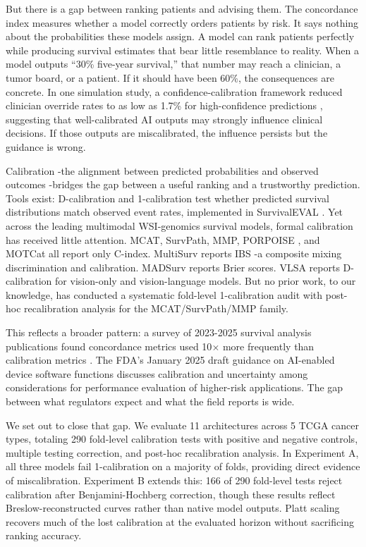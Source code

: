 \documentclass[pmlr]{jmlr}
\begin{document}
But there is a gap between ranking patients and advising them. The concordance index measures whether a model correctly orders patients by risk. It says nothing about the probabilities these models assign. A model can rank patients perfectly while producing survival estimates that bear little resemblance to reality. When a model outputs ``30\% five-year survival,'' that number may reach a clinician, a tumor board, or a patient. If it should have been 60\%, the consequences are concrete. In one simulation study, a confidence-calibration framework reduced clinician override rates to as low as 1.7\% for high-confidence predictions \citep{yu2025enhancing}, suggesting that well-calibrated AI outputs may strongly influence clinical decisions. If those outputs are miscalibrated, the influence persists but the guidance is wrong.

Calibration -the alignment between predicted probabilities and observed outcomes -bridges the gap between a useful ranking and a trustworthy prediction. Tools exist: D-calibration and 1-calibration \citep{haider2020effective} test whether predicted survival distributions match observed event rates, implemented in SurvivalEVAL \citep{qi2023survivaleval}. Yet across the leading multimodal WSI-genomics survival models, formal calibration has received little attention. MCAT, SurvPath, MMP, PORPOISE \citep{chen2022pan}, and MOTCat \citep{xu2023multimodal} all report only C-index. MultiSurv \citep{valesilva2021multisurv} reports IBS -a composite mixing discrimination and calibration. MADSurv \citep{zhang2025madsurv} reports Brier scores. VLSA \citep{liu2025vlsa} reports D-calibration for vision-only and vision-language models. But no prior work, to our knowledge, has conducted a systematic fold-level 1-calibration audit with post-hoc recalibration analysis for the MCAT/SurvPath/MMP family.

This reflects a broader pattern: a survey of 2023-2025 survival analysis publications found concordance metrics used 10$\times$ more frequently than calibration metrics \citep{lillelund2025stop}. The FDA's January 2025 draft guidance on AI-enabled device software functions \citep{fda2025aidsf} discusses calibration and uncertainty among considerations for performance evaluation of higher-risk applications. The gap between what regulators expect and what the field reports is wide.

We set out to close that gap. We evaluate 11 architectures across 5 TCGA cancer types, totaling 290 fold-level calibration tests with positive and negative controls, multiple testing correction, and post-hoc recalibration analysis. In Experiment A, all three models fail 1-calibration on a majority of folds, providing direct evidence of miscalibration. Experiment B extends this: 166 of 290 fold-level tests reject calibration after Benjamini-Hochberg correction, though these results reflect Breslow-reconstructed curves rather than native model outputs. Platt scaling recovers much of the lost calibration at the evaluated horizon without sacrificing ranking accuracy.
\end{document}
